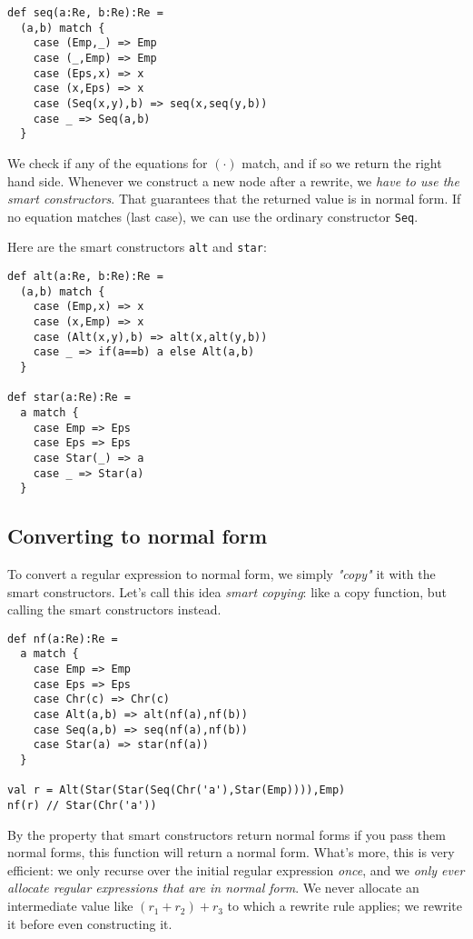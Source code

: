 \begin{lstlisting}
def seq(a:Re, b:Re):Re =
  (a,b) match {
    case (Emp,_) => Emp
    case (_,Emp) => Emp
    case (Eps,x) => x
    case (x,Eps) => x
    case (Seq(x,y),b) => seq(x,seq(y,b))
    case _ => Seq(a,b)
  }
\end{lstlisting}

We check if any of the equations for $(\cdot)$ match, and if so we return the right hand side. Whenever we construct a new node after a rewrite, we \emph{have to use the smart constructors}. That guarantees that the returned value is in normal form. If no equation matches (last case), we can use the ordinary constructor \lstinline|Seq|.

Here are the smart constructors \lstinline|alt| and \lstinline|star|:

\begin{lstlisting}
def alt(a:Re, b:Re):Re =
  (a,b) match {
    case (Emp,x) => x
    case (x,Emp) => x
    case (Alt(x,y),b) => alt(x,alt(y,b))
    case _ => if(a==b) a else Alt(a,b)
  }

def star(a:Re):Re =
  a match {
    case Emp => Eps
    case Eps => Eps
    case Star(_) => a
    case _ => Star(a)
  }
\end{lstlisting}

\subsection{Converting to normal form}

To convert a regular expression to normal form, we simply \emph{"copy"} it with the smart constructors.
Let's call this idea \emph{smart copying}: like a copy function, but calling the smart constructors instead.

\begin{lstlisting}
def nf(a:Re):Re =
  a match {
    case Emp => Emp
    case Eps => Eps
    case Chr(c) => Chr(c)
    case Alt(a,b) => alt(nf(a),nf(b))
    case Seq(a,b) => seq(nf(a),nf(b))
    case Star(a) => star(nf(a))
  }

val r = Alt(Star(Star(Seq(Chr('a'),Star(Emp)))),Emp)
nf(r) // Star(Chr('a'))
\end{lstlisting}

By the property that smart constructors return normal forms if you pass them normal forms, this function will return a normal form. What's more, this is very efficient: we only recurse over the initial regular expression \emph{once}, and we \emph{only ever allocate regular expressions that are in normal form}. We never allocate an intermediate value like $(r_1 + r_2) + r_3$ to which a rewrite rule applies; we rewrite it before even constructing it.

